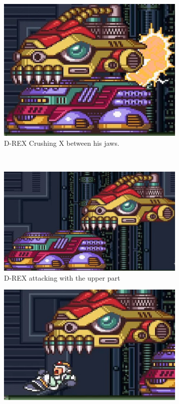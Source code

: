 \begin{figure}[htp]
	\centering
	\begin{subfigure}[t]{0.40\linewidth}
		\centering
		\includegraphics[width=\linewidth]{figures/X1/Sigma_stages/Drex_crush.jpg}
		\caption{D-REX Crushing X between his jaws.}
	\end{subfigure}\\
	\begin{subfigure}[t]{0.45\linewidth}
		\centering
		\includegraphics[width=\linewidth]{figures/X1/Sigma_stages/Drex_press.jpg}
		\caption{D-REX attacking with the upper part}
	\end{subfigure}
	\begin{subfigure}[t]{0.40\linewidth}
		\centering
		\includegraphics[width=\linewidth]{figures/X1/Sigma_stages/Drex_trip.jpg}

\end{subfigure}
\end{figure}
